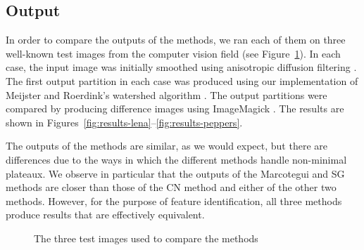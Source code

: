 \documentclass[a4paper]{article}
\newenvironment{stusubfig}[1]
{
	\begin{figure}[#1]
	\begin{center}
}
{
	\end{center}
	\end{figure}
}
\begin{document}
\subsection{Output}

In order to compare the outputs of the methods, we ran each of them on three well-known test images from the computer vision field (see Figure~\ref{fig:testimages}). In each case, the input image was initially smoothed using anisotropic diffusion filtering \cite{perona90}. The first output partition in each case was produced using our implementation of Meijster and Roerdink's watershed algorithm \cite{meijster98}. The output partitions were compared by producing difference images using ImageMagick \cite{imagemagick}. The results are shown in Figures~\ref{fig:results-lena}--\ref{fig:results-peppers}.

The outputs of the methods are similar, as we would expect, but there are differences due to the ways in which the different methods handle non-minimal plateaux. We observe in particular that the outputs of the Marcotegui and SG methods are closer than those of the CN method and either of the other two methods. However, for the purpose of feature identification, all three methods produce results that are effectively equivalent.

\begin{stusubfig}{p}
	\hspace{4mm}%
	\hspace{4mm}%
\caption{The three test images used to compare the methods}
\label{fig:testimages}
\end{stusubfig}
\end{document}
